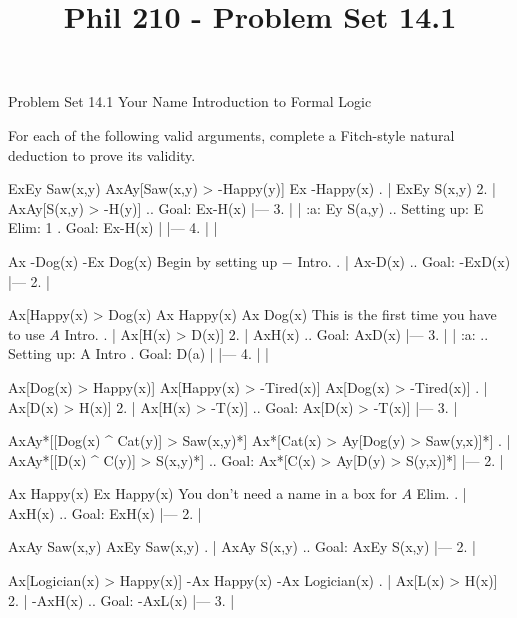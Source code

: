 
\title{Phil 210 - Problem Set 14.1}

\heading
Problem Set 14.1
Your Name
Introduction to Formal Logic
\endheading

For each of the following valid arguments, complete a Fitch-style natural deduction to prove its validity.

\quantifiers
\problems
{}
\argument
 ExEy Saw(x,y)
 AxAy[Saw(x,y) > -Happy(y)]
\argumentline
 Ex -Happy(x)
\endargument
        \answer
        . | ExEy S(x,y)
         2. | AxAy[S(x,y) > -H(y)]  ..  Goal: Ex-H(x)
            |---
         3. |   | :a: Ey S(a,y)     ..  Setting up: E Elim: 1  .  Goal: Ex-H(x)
            |   |---
         4. |   |
        \endfitchproof
        \endanswer

\argument
 Ax -Dog(x)
\argumentline
 -Ex Dog(x)
\endargument
\Hint Begin by setting up $-$ Intro.
        \answer
        . | Ax-D(x)  ..  Goal: -ExD(x)
            |---
         2. | 
        \endfitchproof
        \endanswer

\argument
 Ax[Happy(x) > Dog(x)
 Ax Happy(x)
\argumentline
 Ax Dog(x)
\endargument
\Hint This is the first time you have to use $A$ Intro.
        \answer
        . | Ax[H(x) > D(x)]
         2. | AxH(x)          ..  Goal: AxD(x)
            |---
         3. |   | :a:          ..  Setting up: A Intro  .  Goal: D(a)
            |   |---
         4. |   |
        \endfitchproof
        \endanswer

\argument
 Ax[Dog(x) > Happy(x)]
 Ax[Happy(x) > -Tired(x)]
\argumentline
 Ax[Dog(x) > -Tired(x)]
\endargument
        \answer
        . | Ax[D(x) > H(x)]
         2. | Ax[H(x) > -T(x)]  ..  Goal: Ax[D(x) > -T(x)]
            |---
         3. | 
        \endfitchproof
        \endanswer

\argument
 AxAy*[[Dog(x) ^ Cat(y)] > Saw(x,y)*]
\argumentline
 Ax*[Cat(x) > Ay[Dog(y) > Saw(y,x)]*]
\endargument
        \answer
        . | AxAy*[[D(x) ^ C(y)] > S(x,y)*]  ..  Goal: Ax*[C(x) > Ay[D(y) > S(y,x)]*]
            |---
         2. | 
        \endfitchproof
        \endanswer

\argument
 Ax Happy(x)
\argumentline
 Ex Happy(x)
\endargument
\Hint You don't need a name in a box for $A$ Elim.
        \answer
        . | AxH(x)  ..  Goal: ExH(x)
            |---
         2. | 
        \endfitchproof
        \endanswer

\argument
 AxAy Saw(x,y)
\argumentline
 AxEy Saw(x,y)
\endargument
        \answer
        . | AxAy S(x,y)  ..  Goal: AxEy S(x,y)
            |---
         2. |
        \endfitchproof
        \endanswer

\argument
 Ax[Logician(x) > Happy(x)]
 -Ax Happy(x)
\argumentline
 -Ax Logician(x)
\endargument
        \answer
        . | Ax[L(x) > H(x)]
         2. | -AxH(x)         ..  Goal: -AxL(x)
            |---
         3. |
        \endfitchproof
        \endanswer

\endproblems
\bye
